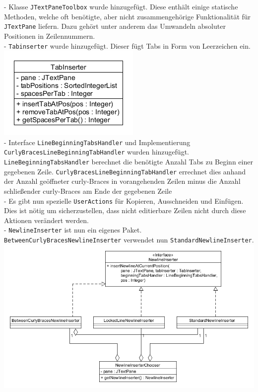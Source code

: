 \documentclass[a4paper]{scrreprt}
\begin{document}
- Klasse \verb!JTextPaneToolbox! wurde hinzugefügt. Diese enthält einige statische Methoden, welche oft benötigte, aber nicht zusammengehörige Funktionalität für \verb!JTextPane! liefern. Dazu gehört unter anderem das Umwandeln absoluter Positionen in Zeilennummern.\\
- \verb!Tabinserter! wurde hinzugefügt. Dieser fügt Tabs in Form von Leerzeichen ein.\\
\includegraphics[scale=0.5]{Tabinserter.png}\\
- Interface \verb!LineBeginningTabsHandler! und Implementierung \verb!CurlyBracesLineBeginningTabHandler! wurden hinzugefügt. \verb!LineBeginningTabsHandler! berechnet die benötigte Anzahl Tabs zu Beginn einer gegebenen Zeile. \verb!CurlyBracesLineBeginningTabHandler! errechnet dies anhand der Anzahl geöffneter curly-Braces in vorangehenden Zeilen minus die Anzahl schließender curly-Braces am Ende der gegebenen Zeile\\
- Es gibt nun spezielle \verb!UserActions! für Kopieren, Ausschneiden und Einfügen. Dies ist nötig um sicherzustellen, dass nicht editierbare Zeilen nicht durch diese Aktionen verändert werden.\\
- \verb!NewlineInserter! ist nun ein eigenes Paket. \verb!BetweenCurlyBracesNewlineInserter! verwendet nun \verb!StandardNewlineInserter!.\\
\includegraphics[scale=0.5]{insertnewline_update.png}
\end{document}
